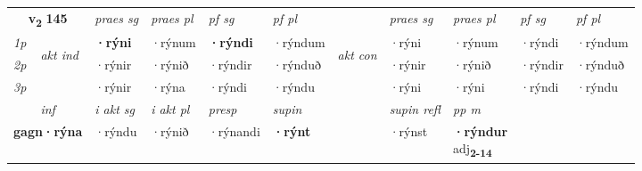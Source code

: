\noindent
\begin{tabular}{lllllllllll} \toprule
\multicolumn{2}{c}{\textbf{v{\textsubscript{2}}} \Large{\textbf{145}}}  &  \textit{praes sg}  & \textit{praes pl}  &\textit{ pf sg} & \textit{pf pl} &  &  \textit{praes sg}  & \textit{praes pl}  & \textit{pf sg} & \textit{pf pl } \\*
	\cmidrule{3-6} \cmidrule{8-11}
 {\textit{1p}} & \multirow{3}{*}{\begin{turn}{90}\textit{akt ind}\end{turn}} & \textbf{·rýni} & ·rýnum & \textbf{·rýndi} & ·rýndum & \multirow{3}{*}{\begin{turn}{90}\textit{akt con}\end{turn}} &·rýni & ·rýnum & ·rýndi & ·rýndum\\*
 {\textit{2p}} &  &  ·rýnir  & ·rýnið & ·rýndir & ·rýnduð & & ·rýnir & ·rýnið & ·rýndir & ·rýnduð \\*
{\textit{3p}} &  & ·rýnir & ·rýna & ·rýndi & ·rýndu & & ·rýni & ·rýni& ·rýndi & ·rýndu \\*
\cmidrule{3-6} \cmidrule{8-11}

   \multicolumn{2}{c}{\textit{inf}}  & \textit{i akt sg} & \textit{i akt pl}   & \textit{presp} & \textit{supin} && \textit{supin refl} & \textit{pp m} \\*
  \multicolumn{2}{c}{\textbf{gagn\allowbreak ·rýna}} & ·rýndu  & ·rýnið   & ·rýnandi &  \textbf{·rýnt} && ·rýnst & \specialcell{\textbf{·rýndur} \\ adj\textbf{\textsubscript{2-14}}} \\*
\end{tabular}

